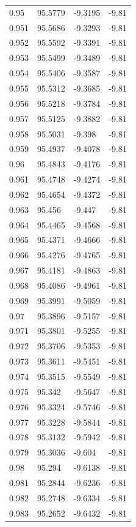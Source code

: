 \begin{tabular}{llll}
0.95 & 95.5779 & -9.3195 & -9.81 \\
0.951 & 95.5686 & -9.3293 & -9.81 \\
0.952 & 95.5592 & -9.3391 & -9.81 \\
0.953 & 95.5499 & -9.3489 & -9.81 \\
0.954 & 95.5406 & -9.3587 & -9.81 \\
0.955 & 95.5312 & -9.3685 & -9.81 \\
0.956 & 95.5218 & -9.3784 & -9.81 \\
0.957 & 95.5125 & -9.3882 & -9.81 \\
0.958 & 95.5031 & -9.398 & -9.81 \\
0.959 & 95.4937 & -9.4078 & -9.81 \\
0.96 & 95.4843 & -9.4176 & -9.81 \\
0.961 & 95.4748 & -9.4274 & -9.81 \\
0.962 & 95.4654 & -9.4372 & -9.81 \\
0.963 & 95.456 & -9.447 & -9.81 \\
0.964 & 95.4465 & -9.4568 & -9.81 \\
0.965 & 95.4371 & -9.4666 & -9.81 \\
0.966 & 95.4276 & -9.4765 & -9.81 \\
0.967 & 95.4181 & -9.4863 & -9.81 \\
0.968 & 95.4086 & -9.4961 & -9.81 \\
0.969 & 95.3991 & -9.5059 & -9.81 \\
0.97 & 95.3896 & -9.5157 & -9.81 \\
0.971 & 95.3801 & -9.5255 & -9.81 \\
0.972 & 95.3706 & -9.5353 & -9.81 \\
0.973 & 95.3611 & -9.5451 & -9.81 \\
0.974 & 95.3515 & -9.5549 & -9.81 \\
0.975 & 95.342 & -9.5647 & -9.81 \\
0.976 & 95.3324 & -9.5746 & -9.81 \\
0.977 & 95.3228 & -9.5844 & -9.81 \\
0.978 & 95.3132 & -9.5942 & -9.81 \\
0.979 & 95.3036 & -9.604 & -9.81 \\
0.98 & 95.294 & -9.6138 & -9.81 \\
0.981 & 95.2844 & -9.6236 & -9.81 \\
0.982 & 95.2748 & -9.6334 & -9.81 \\
0.983 & 95.2652 & -9.6432 & -9.81 \\

\end{tabular}
